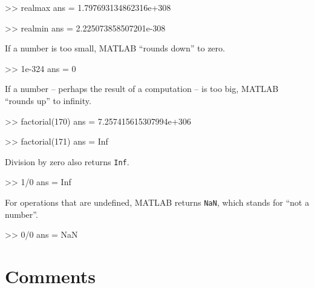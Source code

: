 \documentclass[
]{book}
\numberwithin{Answer}{chapter}
\numberwithin{Exercise}{chapter}
\begin{document}

\begin{code}
>> realmax
ans = 1.797693134862316e+308

>> realmin
ans = 2.225073858507201e-308
\end{code}

%

If a number is too small, MATLAB ``rounds down'' to zero.

\begin{code}
>> 1e-324
ans = 0
\end{code}

If a number -- perhaps the result of a computation -- is too big, 
MATLAB ``rounds up'' to infinity.


\begin{code}
>> factorial(170)
ans = 7.257415615307994e+306

>> factorial(171)
ans = Inf
\end{code}

Division by zero also returns {\tt Inf}.

\begin{code}
>> 1/0
ans = Inf
\end{code}



For operations that are undefined, MATLAB returns {\tt NaN},
which stands for ``not a number''.


\begin{code}
>> 0/0
ans = NaN
\end{code}



\section{Comments}
\end{document}
